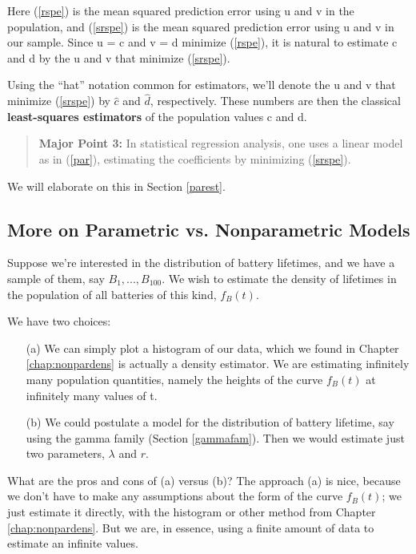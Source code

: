 Here (\ref{rspe}) is the mean squared prediction error using u and v in
the population, and (\ref{srspe}) is the mean squared prediction error
using u and v in our sample.  Since u = c and v = d minimize
(\ref{rspe}), it is natural to estimate c and d by the u and v that
minimize (\ref{srspe}).  

Using the ``hat'' notation common for estimators, we'll denote the u and
v that minimize (\ref{srspe}) by $\hat{c}$ and $\hat{d}$, respectively.
These numbers are then the classical {\bf least-squares
estimators} of the population values c and d.

\begin{quote}
{\bf Major Point 3:}  In statistical regression analysis, one uses a
linear model as in (\ref{par}), estimating the coefficients by
minimizing (\ref{srspe}).
\end{quote}

We will elaborate on this in Section \ref{parest}.

\subsection{More on Parametric vs. Nonparametric Models}

Suppose we're interested in the distribution of battery lifetimes, and
we have a sample of them, say $B_1,...,B_{100}$.  We wish to estimate
the density of lifetimes in the population of all batteries of this
kind, $f_B(t)$.

We have two choices:

\begin{itemize}

\item [(a)] We can simply plot a histogram of our data, which we found
in Chapter \ref{chap:nonpardens} is actually a density estimator.  We
are estimating infinitely many population quantities, namely the heights
of the curve $f_B(t)$ at infinitely many values of t.

\item [(b)] We could postulate a model for the distribution of battery
lifetime, say using the gamma family (Section \ref{gammafam}).  Then we
would estimate just two parameters, $\lambda$ and $r$.

\end{itemize}

What are the pros and cons of (a) versus (b)?  The approach (a) is nice,
because we don't have to make any assumptions about the form of the
curve $f_B(t)$; we just estimate it directly, with the histogram or
other method from Chapter \ref{chap:nonpardens}.  But we are, in
essence, using a finite amount of data to estimate an infinite values.

